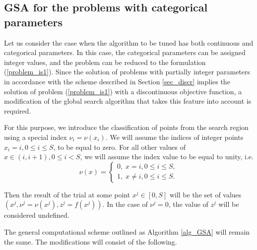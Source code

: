 \documentclass[iicol]{sn-jnl}
\theoremstyle{thmstyleone}%
\theoremstyle{thmstyletwo}%
\theoremstyle{thmstylethree}%
\begin{document}
\subsection{GSA for the problems with categorical parameters}\label{sec_mGSA}

Let us consider the case when the algorithm to be tuned has both continuous and categorical parameters.  In this case, the categorical parameters can be assigned integer values, and the problem can be reduced to the formulation (\ref{problem_is1}).
Since the solution of problems with partially integer parameters in accordance with the scheme described in Section \ref{sec_discr} implies the solution of problem (\ref{problem_is1}) with a discontinuous objective function, a modification of the global search algorithm that takes this feature into account is required.

For this purpose, we introduce the classification of points from the search region using a special index $\nu_i=\nu(x_i)$. We will assume the indices of integer points $x_i = i, 0\leq i \leq S$, to be equal to zero. For all other values of $x\in(i,i+1),  0 \leq i < S$, we will assume the index value to be equal to unity, i.e.  
\begin{equation}\label{index}
	\nu(x) = \left\{
   \begin{array}{lr}
     0, \; x = i, 0\leq i \leq S, \\
     1, \; x \neq i,  0 \leq i \leq S.
   \end{array}
\right.
\end{equation}

Then the result of the trial at some point $x^j\in[0,S]$  will be the set of values $(x^j, \nu^j=\nu(x^j), z^j = f(x^j))$. In the case of  $\nu^j=0$, the value of $z^j$ will be considered undefined.

The general computational scheme outlined as Algorithm \ref{alg_GSA} will remain the same. The modifications will consist of the following.
\end{document}
